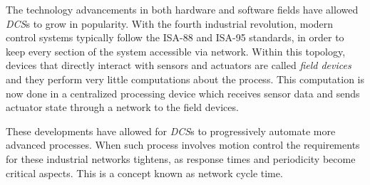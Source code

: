 The technology advancements in both hardware and software fields have allowed \emph{DCS}s to grow in popularity. With the fourth industrial revolution, modern control systems typically follow the ISA-88 \cite{standard:isa88} and ISA-95 \cite{standard:isa95} standards, in order to keep every section of the system accessible via network. Within this topology, devices that directly interact with sensors and actuators are called \emph{field devices} and they perform very little computations about the process. This computation is now done in a centralized processing device which receives sensor data and sends actuator state through a network to the field devices.


These developments have allowed for \emph{DCS}s to progressively automate more advanced processes. When such process involves motion control the requirements for these industrial networks tightens, as response times and periodicity become critical aspects. This is a concept known as network cycle time.
